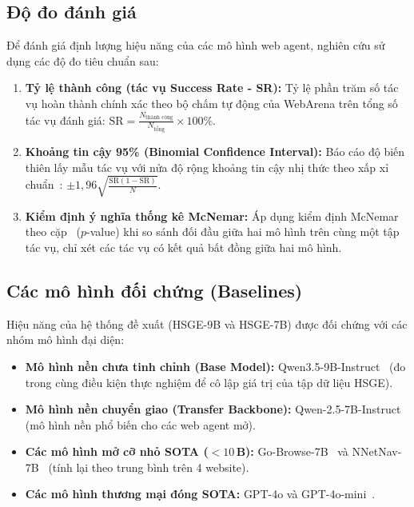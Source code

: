 \subsection{Độ đo đánh giá}
\label{sec:exp-metrics}

Để đánh giá định lượng hiệu năng của các mô hình web agent, nghiên cứu sử dụng các độ đo tiêu chuẩn sau:

\begin{enumerate}
  \item \textbf{Tỷ lệ thành công (tác vụ Success Rate - SR):} Tỷ lệ phần trăm số tác vụ hoàn thành chính xác theo bộ chấm tự động của WebArena trên tổng số tác vụ đánh giá: $\text{SR} = \frac{N_{\text{thành công}}}{N_{\text{tổng}}} \times 100\%$.
  \item \textbf{Khoảng tin cậy 95\% (Binomial Confidence Interval):} Báo cáo độ biến thiên lấy mẫu tác vụ với nửa độ rộng khoảng tin cậy nhị thức theo xấp xỉ chuẩn~\cite{brown2001binomial}: $\pm 1{,}96 \sqrt{\frac{\text{SR}(1-\text{SR})}{N}}$.
  \item \textbf{Kiểm định ý nghĩa thống kê McNemar:} Áp dụng kiểm định McNemar theo cặp~\cite{mcnemar1947} ($p$-value) khi so sánh đối đầu giữa hai mô hình trên cùng một tập tác vụ, chỉ xét các tác vụ có kết quả bất đồng giữa hai mô hình.
\end{enumerate}

\subsection{Các mô hình đối chứng (Baselines)}
\label{sec:exp-baselines}

Hiệu năng của hệ thống đề xuất (HSGE-9B và HSGE-7B) được đối chứng với các nhóm mô hình đại diện:

\begin{itemize}
  \item \textbf{Mô hình nền chưa tinh chỉnh (Base Model):} Qwen3.5-9B-Instruct~\cite{qwen2026qwen35} (đo trong cùng điều kiện thực nghiệm để cô lập giá trị của tập dữ liệu HSGE).
  \item \textbf{Mô hình nền chuyển giao (Transfer Backbone):} Qwen-2.5-7B-Instruct~\cite{qwen2024qwen25} (mô hình nền phổ biến cho các web agent mở).
  \item \textbf{Các mô hình mở cỡ nhỏ SOTA ($<10$\,B):} Go-Browse-7B~\cite{gandhi2026gobrowse} và NNetNav-7B~\cite{murty2024nnetnav} (tính lại theo trung bình trên 4 website).
  \item \textbf{Các mô hình thương mại đóng SOTA:} GPT-4o và GPT-4o-mini~\cite{gandhi2026gobrowse}.
\end{itemize}

